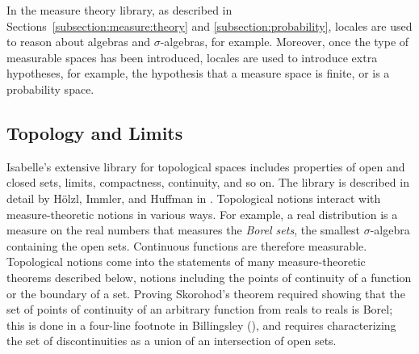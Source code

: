\documentclass{svjour3}
\begin{document}
In the measure theory library, as described in Sections~\ref{subsection:measure:theory} and \ref{subsection:probability}, locales are used to reason about algebras and $\sigma$-algebras, for example. Moreover, once the type of measurable spaces has been introduced, locales are used to introduce extra hypotheses, for example, the hypothesis that a measure space is finite, or is a probability space.

\subsection{Topology and Limits}
\label{subsection:topology}

Isabelle's extensive library for topological spaces includes properties of open and closed sets, limits, compactness, continuity, and so on. The library is described in detail by H\"olzl, Immler, and Huffman in \cite{hoelzl:et:al:13}. Topological notions interact with measure-theoretic notions in various ways. For example, a real distribution is a measure on the real numbers that measures the \emph{Borel sets}, the smallest $\sigma$-algebra containing the open sets. Continuous functions are therefore measurable. Topological notions come into the statements of many measure-theoretic theorems described below, notions including the points of continuity of a function or the boundary of a set. Proving Skorohod's theorem required showing that the set of points of continuity of an arbitrary function from reals to reals is Borel; this is done in a four-line footnote in Billingsley (\cite[page 334]{billingsley:95}), and requires characterizing the set of discontinuities as a union of an intersection of open sets.
\end{document}
